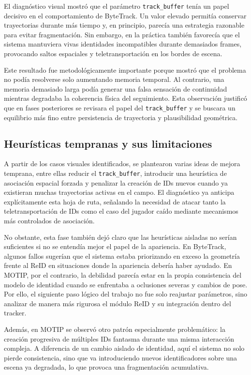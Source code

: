 \documentclass[../MAIN.tex]{subfiles}
\begin{document}
	El diagnóstico visual mostró que el parámetro \texttt{track\_buffer} tenía un papel decisivo en el comportamiento de ByteTrack. Un valor elevado permitía conservar trayectorias durante más tiempo y, en principio, parecía una estrategia razonable para evitar fragmentación. Sin embargo, en la práctica también favorecía que el sistema mantuviera vivas identidades incompatibles durante demasiados frames, provocando saltos espaciales y teletransportación en los bordes de escena.
	
	Este resultado fue metodológicamente importante porque mostró que el problema no podía resolverse solo aumentando memoria temporal. Al contrario, una memoria demasiado larga podía generar una falsa sensación de continuidad mientras degradaba la coherencia física del seguimiento. Esta observación justificó que en fases posteriores se revisara el papel del \texttt{track\_buffer} y se buscara un equilibrio más fino entre persistencia de trayectoria y plausibilidad geométrica.
	
	\subsection{Heurísticas tempranas y sus limitaciones}
	
	A partir de los casos visuales identificados, se plantearon varias ideas de mejora temprana, entre ellas reducir el \texttt{track\_buffer}, introducir una heurística de asociación espacial forzada y penalizar la creación de IDs nuevos cuando ya existieran muchas trayectorias activas en el campo. El diagnóstico ya anticipa explícitamente esta hoja de ruta, señalando la necesidad de atacar tanto la teletransportación de IDs como el caso del jugador caído mediante mecanismos más controlados de asociación.
	
	No obstante, esta fase también dejó claro que las heurísticas aisladas no serían suficientes si no se entendía mejor el papel de la apariencia. En ByteTrack, algunos fallos sugerían que el sistema estaba priorizando en exceso la geometría frente al ReID en situaciones donde la apariencia debería haber ayudado. En MOTIP, por el contrario, la debilidad parecía estar en la propia consistencia del modelo de identidad cuando se enfrentaba a oclusiones severas y cambios de pose. Por ello, el siguiente paso lógico del trabajo no fue solo reajustar parámetros, sino analizar de manera más rigurosa el módulo ReID y su integración dentro del tracker.
	
	Además, en MOTIP se observó otro patrón especialmente problemático: la creación progresiva de múltiples IDs fantasma durante una misma interacción compleja. A diferencia de un cambio aislado de identidad, aquí el sistema no solo pierde consistencia, sino que va introduciendo nuevos identificadores sobre una escena ya degradada, lo que provoca una fragmentación acumulativa.
	
\end{document}
